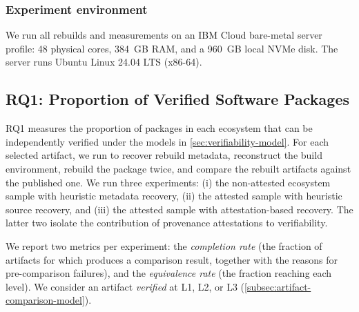 \subsubsection{Experiment environment}
\label{subsubsec:rebuild-env}

We run all rebuilds and measurements on an IBM Cloud bare-metal server profile: 48 physical cores, 384\, GB RAM, and a 960\, GB local NVMe disk. The server runs Ubuntu Linux 24.04 LTS (x86-64). 


\subsection{RQ1: Proportion of Verified Software Packages}

RQ1 measures the proportion of packages in each ecosystem that can be independently verified under the models in \cref{sec:verifiability-model}. For each selected artifact, we run \toolname to recover rebuild metadata, reconstruct the build environment, rebuild the package twice, and compare the rebuilt artifacts against the published one. We run three experiments: (i) the non-attested ecosystem sample with heuristic metadata recovery, (ii) the attested
sample with heuristic source recovery, and (iii) the attested sample with attestation-based recovery. The latter two isolate the contribution of provenance attestations to verifiability.

We report two metrics per experiment: the \textit{completion rate} (the fraction of artifacts for which \toolname produces a comparison result, together with the reasons for pre-comparison failures), and the \textit{equivalence rate} (the fraction reaching each level). We consider an artifact \textit{verified} at L1, L2, or L3 (\cref{subsec:artifact-comparison-model}).


